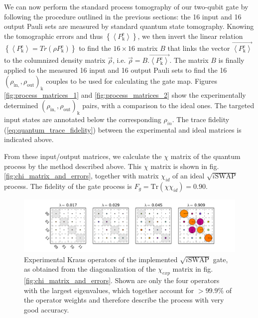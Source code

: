 We can now perform the standard process tomography of our two-qubit gate by following the procedure outlined in the previous sections: the 16 input and 16 output Pauli sets are measured by standard quantum state tomography. 
Knowing the tomographic errors and thus $\left\{ \left\langle P_{\mathrm{k}}^{\mathrm{e}}\right\rangle \right\} $,
we then invert the linear relation $\left\{ \left\langle P_{\mathrm{k}}^{\mathrm{e}}\right\rangle =Tr\left(\rho P_{\mathrm{k}}^{\mathrm{e}}\right)\right\} $
to find the $16\times16$ matrix $B$ that links the vector $\overrightarrow{\left\langle P_{\mathrm{k}}^{\mathrm{e}}\right\rangle }$
to the columnized density matrix $\overrightarrow{\rho}$, i.e. $\overrightarrow{\rho}=B.\overrightarrow{\left\langle P_{\mathrm{k}}^{\mathrm{e}}\right\rangle }$.
The matrix $B$ is finally applied to the measured 16 input and
16 output Pauli sets to find the 16 $(\rho_{\mathrm{in},},\rho_{\mathrm{out}})_{\mathrm{k}}$
couples to be used for calculating the gate map. Figures \ref{fig:process_matrices_1} and \ref{fig:process_matrices_2} show the experimentally determined $(\rho_{\mathrm{in},},\rho_{\mathrm{out}})_{\mathrm{k}}$ pairs, with a comparison to the ideal ones. The targeted input states are annotated below the corresponding $\rho_{in}$. The trace fidelity (\ref{eq:quantum_trace_fidelity}) between the experimental and ideal matrices is indicated above.

\smallskip

From these input/output matrices, we calculate the $\chi$ matrix of the quantum process by the method described above. This $\chi$ matrix is shown in fig. \ref{fig:chi_matrix_and_errors}, together with matrix $\chi_{id}$ of an ideal  $\sqrt{i\mathrm{SWAP}}$ process. The fidelity of the gate process is $F_g=\mathrm{Tr}(\chi \chi_{id})=0.90$.

\smallskip

\begin{figure}[ht!]
	\centering
		\includegraphics[width=1.\textwidth]{"./data/ct5/2011_04_21 - grover and tomo/good_data/process_kraus_operators"}
	\caption{Experimental Kraus operators of the implemented $\sqrt{i\mathrm{SWAP}}$ gate, as obtained from the diagonalization of the $\chi_{exp}$ matrix in fig. \ref{fig:chi_matrix_and_errors}. Shown are only the four operators with the largest eigenvalues, which together account for $>99.9 \%$ of the operator weights and therefore describe the process with very good accuracy.}
	\label{fig:kraus_operators}
\end{figure}

